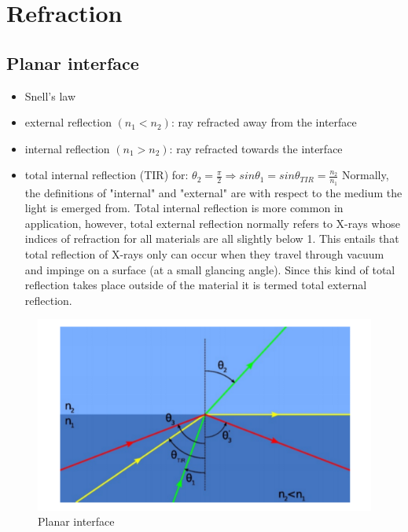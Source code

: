 \documentclass[../main.tex]{subfiles}
\begin{document}
	\section{Refraction}
	\subsection{Planar interface}
	\begin{itemize}  
	\item Snell’s law
	\item external reflection $(n_1<n_2)$: ray refracted away from the interface
	\item internal reflection $(n_1>n_2)$: ray refracted towards the interface
	\item total internal reflection (TIR) for: $\theta_2 = \frac{\pi}{2}\Rightarrow sin\theta_1=sin\theta_{TIR}=\frac{n_2}{n_1}$
	Normally, the definitions of "internal" and "external" are with respect to the medium the light is emerged from. Total internal reflection is more common in application, however, total external reflection normally refers to X-rays whose indices of refraction for all materials are all slightly below 1. This entails that total reflection of X-rays only can occur when they travel through vacuum and impinge on a surface (at a small glancing angle). Since this kind of total reflection takes place outside of the material it is termed total external reflection.
	\end{itemize}
	\begin{figure}[h!]
	  \centering
	  \includegraphics[scale=0.7]{../graphics/Optical_components6.png}
	  \caption{Planar interface}
	  \label{fig:interface1}
	\end{figure}
\end{document}
